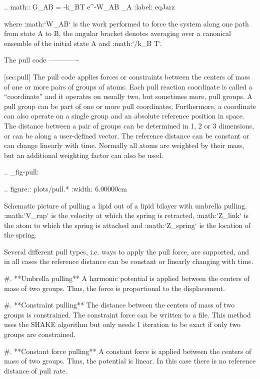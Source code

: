 .. math:: \Delta G_{AB} = -k_BT \log \left\langle e^{-\beta W_{AB}} \right\rangle_A
          :label: eqJarz

where :math:`W_{AB}` is the work performed to force the system along
one path from state A to B, the angular bracket denotes averaging over a
canonical ensemble of the initial state A and :math:`/k_B T`.

The pull code
-------------

[sec:pull] The pull code applies forces or constraints between the
centers of mass of one or more pairs of groups of atoms. Each pull
reaction coordinate is called a “coordinate” and it operates on usually
two, but sometimes more, pull groups. A pull group can be part of one or
more pull coordinates. Furthermore, a coordinate can also operate on a
single group and an absolute reference position in space. The distance
between a pair of groups can be determined in 1, 2 or 3 dimensions, or
can be along a user-defined vector. The reference distance can be
constant or can change linearly with time. Normally all atoms are
weighted by their mass, but an additional weighting factor can also be
used.

.. _fig-pull:

.. figure:: plots/pull.*
   :width: 6.00000cm

   Schematic picture of pulling a lipid out of a lipid bilayer with
   umbrella pulling. :math:`V_{rup}` is the velocity at which the spring
   is retracted, :math:`Z_{link}` is the atom to which the spring is
   attached and :math:`Z_{spring}` is the location of the spring.

Several different pull types, i.e. ways to apply the pull force, are
supported, and in all cases the reference distance can be constant or
linearly changing with time.

#. **Umbrella pulling** A harmonic potential is applied between the
   centers of mass of two groups. Thus, the force is proportional to the
   displacement.

#. **Constraint pulling** The distance between the centers of mass of
   two groups is constrained. The constraint force can be written to a
   file. This method uses the SHAKE algorithm but only needs 1 iteration
   to be exact if only two groups are constrained.

#. **Constant force pulling** A constant force is applied between the
   centers of mass of two groups. Thus, the potential is linear. In this
   case there is no reference distance of pull rate.

